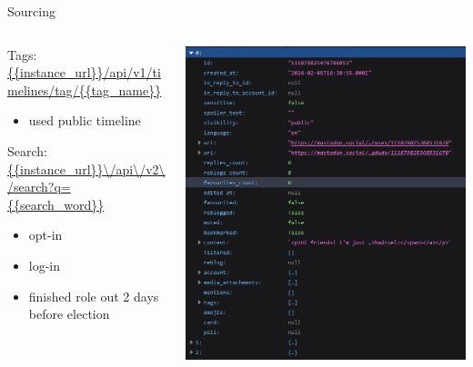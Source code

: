 \begin{frame}{Sourcing}
		\begin{columns}
		
		\begin{column}{0.65\textwidth}
			\begin{tcolorbox}[enhanced jigsaw, colback=white, opacityback=.4, colframe=ElixirPurple, arc=3mm, boxrule=0mm, height=0.8\textheight, valign=center, title=Endpoints]
				Tags: \url{ {{instance_url}}/api/v1/timelines/tag/{{tag_name}} }
				\begin{itemize}
					\item used public timeline
				\end{itemize}
				Search: \url{ {{instance\_url}}\/api\/v2\/search?q={{search\_word}} }
				\begin{itemize}
					\item opt-in
					\item log-in
					\item finished role out 2 days before election
				\end{itemize}
			\end{tcolorbox}
		\end{column}
		
		\begin{column}{0.45\textwidth}
			\begin{tcolorbox}[enhanced jigsaw, colback=white, opacityback=.4, colframe=ElixirPurple, arc=3mm, boxrule=0mm, height=0.8\textheight, valign=center, title=Tags]
				\includegraphics[height=\tcbtextheight,   keepaspectratio]{pictures/tag_bayern.png}
			\end{tcolorbox}
		\end{column}
		
	\end{columns}
\end{frame}

